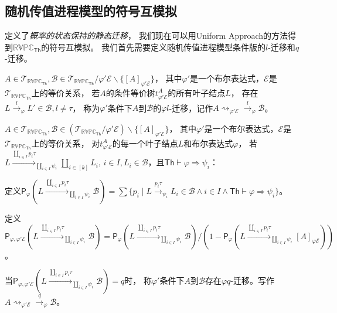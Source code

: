 \subsection{随机传值进程模型的符号互模拟}\label{ch:symbolic_bisimulation}
定义了\textit{概率的状态保持的静态迁移}，
我们现在可以用Uniform Approach的方法得到$\mathbb{RVPC}_{\mathsf{Th}}$的符号互模拟。
我们首先需要定义随机传值进程模型条件版的$l$-迁移和$q$-迁移。

\begin{definition}
   $A\in \mathcal{T}_{\mathbb{RVPC}_{\mathsf{Th}}}, \mathcal{B}\in \mathcal{T}_{\mathbb{RVPC}_{\mathsf{Th}}}/\varphi'\mathcal{E}\backslash \{[A]_{\varphi'\mathcal{E}}\}$，
   其中$\varphi'$是一个布尔表达式，$\mathcal{E}$是$\mathcal{T}_{\mathbb{RVPC}_{\mathsf{Th}}}$上的等价关系，
   若$A$的条件等价树$t_{\varphi' \mathcal{E}}^A$的所有叶子结点$L$，
   存在$L\stackrel{l}{\rightarrow}_{\varphi} L'\in \mathcal{B},l\neq \tau$，
   称为$\varphi'$条件下$A$到$\mathcal{B}$的$\varphi l$-迁移，记作$A\rightsquigarrow_{\varphi'\mathcal{E}}\stackrel{l}{\rightarrow}_{\varphi}\mathcal{B}$。
\end{definition}

\begin{definition}
   $A\in \mathcal{T}_{\mathbb{RVPC}_{\mathsf{Th}}},\mathcal{B}\in (\mathcal{T}_{\mathbb{RVPC}_{\mathsf{Th}}}/\varphi' \mathcal{E})\backslash \{[A]_{\varphi'\mathcal{E}}\}$，
   其中$\varphi'$是一个布尔表达式，$\mathcal{E}$是$\mathcal{T}_{\mathbb{RVPC}_{\mathsf{Th}}}$上的等价关系，
   对$t^A_{\varphi' \mathcal{E}}$的每一个叶子结点$L$和布尔表达式$\varphi$，
   若$L\stackrel{\coprod_{i\in I}p_i\tau}{\longrightarrow}_{\coprod_{i\in I}\psi_i} \coprod_{i\in [k]}L_i$,
$i\in I, L_i\in \mathcal{B}$，且$\mathsf{Th}\vdash \varphi \Rightarrow \psi_i$：

定义$\mathsf{P}_\varphi(L\stackrel{\coprod_{i\in I}p_i\tau}{\longrightarrow}_{\coprod_{i\in I}\psi_i}\mathcal{B}) = \sum\{p_i\mid L\stackrel{p_i\tau}{\rightarrow}_{\psi_i} L_i\in\mathcal{B} \wedge i\in I \wedge \mathsf{Th}\vdash \varphi \Rightarrow \psi_i\}$。

定义$\mathsf{P}_{\varphi, \varphi' \mathcal{E}}(L\stackrel{\coprod_{i\in I}p_i\tau}{\longrightarrow}_{\coprod_{i\in I}\psi_i}\mathcal{B}) = \mathsf{P}_\varphi(L\stackrel{\coprod_{i\in I}p_i\tau}{\longrightarrow}_{\coprod_{i\in I}\psi_i}\mathcal{B})/(1-\mathsf{P}_\varphi(L\stackrel{\coprod_{i\in I}p_i\tau}{\longrightarrow}_{\coprod_{i\in I}\psi_i}[A]_{\varphi\mathcal{E}}))$。

当$\mathsf{P}_{\varphi,\varphi' \mathcal{E}}(L\stackrel{\coprod_{i\in I}p_i\tau}{\longrightarrow}_{\coprod_{i\in I}\psi_i}\mathcal{B})=q$时，
称$\varphi'$条件下$A$到$\mathcal{B}$存在$\varphi q$-迁移。写作$A\rightsquigarrow_{\varphi'\mathcal{E}} \stackrel{q}{\rightarrow}_{\varphi} \mathcal{B}$。
\end{definition}

